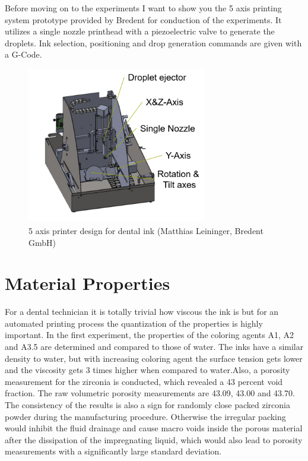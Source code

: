 Before moving on to the experiments I want to show you the 5 axis printing system prototype provided by Bredent for conduction of the experiments. 
It utilizes a single nozzle printhead  with a piezoelectric valve to generate the droplets. Ink selection, positioning and drop generation commands are given with a G-Code.
\begin{figure}[h]
	\centering
	\includegraphics[width=0.7\textwidth]{grafiken/PrototypeText.png}
	\caption{5 axis printer design for dental ink (Matthias Leininger, Bredent GmbH)}
	\label{fig:Prototype}
\end{figure} 

\section{Material Properties}
For a dental technician it is totally trivial how viscous the ink is but for an automated printing  process the quantization of the properties is highly important. In the first experiment, the properties of the coloring agents A1, A2 and A3.5 are determined and compared to those of water. The inks have a similar density to water, but with increasing coloring agent the surface tension gets lower and the viscosity gets 3 times higher when compared to water.Also, a porosity measurement for the zirconia is conducted, which revealed a 43 percent void fraction. The raw volumetric porosity measurements are 43.09,	43.00 and 43.70. The consistency of the results is also a sign for randomly close packed zirconia powder during the manufacturing procedure. Otherwise the irregular packing would inhibit the fluid drainage and cause macro voids inside the porous material after the dissipation of the impregnating liquid, which would also lead to porosity measurements with a significantly large standard deviation. 
 

